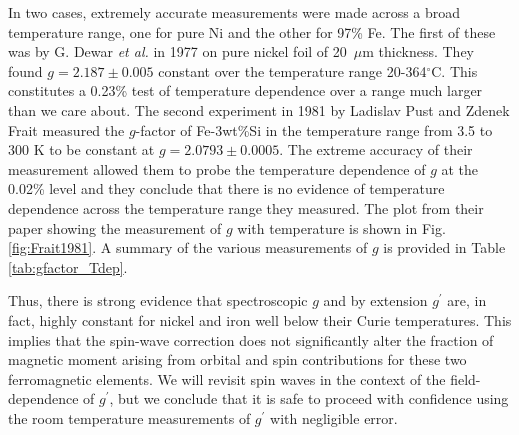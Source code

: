 \documentclass[preprint,12pt]{elsarticle}
\begin{document}
{In two cases, extremely accurate measurements were made across a broad temperature range, one for pure Ni and the other for 97\% Fe. The first of these was by G. Dewar {\it et al.} in 1977 on pure nickel foil of 20~$\mu$m thickness. They found $g=2.187\pm0.005$ constant over the temperature range 20-364$^{\circ}$C\cite{Dewar1977}. This constitutes a 0.23\% test of temperature dependence over a range much larger than we care about. The second experiment in 1981 by Ladislav Pust and Zdenek Frait measured the $g$-factor of Fe-3wt\%Si in the temperature range from 3.5 to 300 K to be constant at $g=2.0793\pm0.0005$\cite{Pust1981}. The extreme accuracy of their measurement allowed them to probe the temperature dependence of $g$ at the 0.02\% level and they conclude that there is no evidence of temperature dependence across the temperature range they measured. The plot from their paper showing the measurement of $g$ with temperature is shown in Fig. \ref{fig:Frait1981}. A summary of the various measurements of $g$ is provided in Table \ref{tab:gfactor_Tdep}.

Thus, there is strong evidence that spectroscopic $g$ and by extension $g^{\prime}$ are, in fact, highly constant for nickel and iron well below their Curie temperatures. This implies that the spin-wave correction does not significantly alter the fraction of magnetic moment arising from orbital and spin contributions for these two ferromagnetic elements. We will revisit spin waves in the context of the field-dependence of $g^\prime$, but we conclude that it is safe to proceed with confidence using the room temperature measurements of $g^{\prime}$ with negligible error.

}
\end{document}
